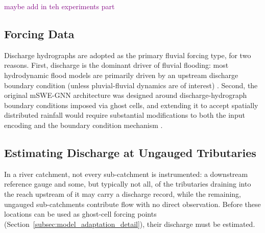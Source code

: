 \documentclass[12pt,a4paper]{report}
\begin{document}
 
 
 
\textcolor{purple}{maybe add in teh experiments part}

\subsection{Forcing Data}
\label{subsec:forcing_data}
 
Discharge hydrographs are adopted as the primary fluvial forcing type, for two reasons. First, discharge is the dominant driver of fluvial flooding: most hydrodynamic flood models are primarily driven by an upstream discharge boundary condition (unless pluvial-fluvial dynamics are of interest) \citep{saksena2019flood}. Second, the original mSWE-GNN architecture was designed around discharge-hydrograph boundary conditions imposed via ghost cells, and extending it to accept spatially distributed rainfall would require substantial modifications to both the input encoding and the boundary condition mechanism \citep{bentivoglio2025mswegnn}.
 
 
\subsection{Estimating Discharge at Ungauged Tributaries}
\label{subsec:ungauged}
 
In a river catchment, not every sub-catchment is instrumented: a downstream reference gauge and some, but typically not all, of the tributaries draining into the reach upstream of it may carry a discharge record, while the remaining, ungauged sub-catchments contribute flow with no direct observation. Before these locations can be used as ghost-cell forcing points (Section~\ref{subsec:model_adaptation_detail}), their discharge must be estimated.
\end{document}

